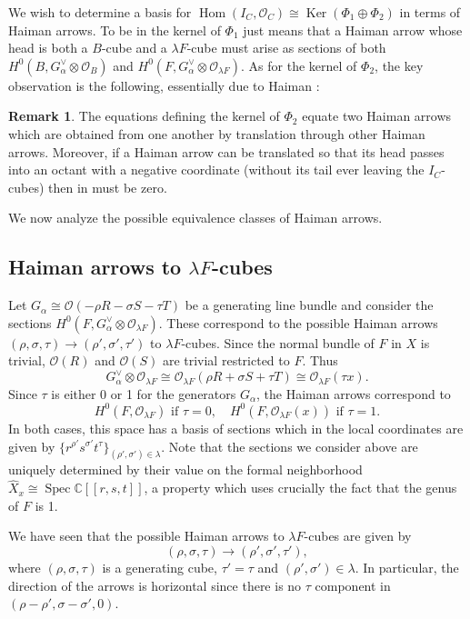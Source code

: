 \documentclass[12pt]{amsart}
\theoremstyle{definition}
\newtheorem{remark}[theorem]{Remark}
\newcommand{\CC} {\mathbb{C}}          %
\renewcommand{\O}{\mathcal{O}}
\newcommand{\Hom}{\operatorname{Hom}}
\newcommand{\Ker}{\operatorname{Ker}}
\newcommand{\Spec}{\operatorname{Spec}}
\renewcommand{\hat}{\widehat}
\begin{document}
We wish to determine a basis for $\Hom (I_{C},\O_{C})\cong \Ker
(\Phi_{1}\oplus \Phi_{2})$ in terms of Haiman arrows. To be in the
kernel of $\Phi_{1}$ just means that a Haiman arrow whose head is both
a $B$-cube and a $\lambda F$-cube must arise as sections of both
$H^{0}(B,G_{\alpha}^{\vee}\otimes \O_{B})$ and
$H^{0}(F,G_{\alpha}^{\vee}\otimes \O_{\lambda F})$. As for the kernel
of $\Phi_{2}$, the key observation is the following, essentially due
to Haiman \cite{Haiman1998}:
\begin{remark}\label{rem: ker of phi2 gives equations equating
translatedarrows} The equations defining the kernel of $\Phi_{2}$
equate two Haiman arrows which are obtained from one another by
translation through other Haiman arrows. Moreover, if a Haiman arrow
can be translated so that its head passes into an octant with a
negative coordinate (without its tail ever leaving the $I_{C}$-cubes)
then in must be zero.
\end{remark}

We now analyze the possible equivalence classes of Haiman arrows.

\subsection{Haiman arrows to $\lambda F$-cubes}

Let $G_{\alpha}\cong \O (-\rho R-\sigma S-\tau T)$ be a generating
line bundle and consider the sections
$H^{0}(F,G_{\alpha}^{\vee}\otimes \O_{\lambda F})$. These correspond
to the possible Haiman arrows $(\rho ,\sigma ,\tau )\to (\rho ',\sigma
',\tau ')$ to $\lambda F$-cubes. Since the normal bundle of $F$ in $X$
is trivial, $\O (R)$ and $\O (S)$ are trivial restricted to $F$. Thus
\[
G_{\alpha}^{\vee}\otimes \O_{\lambda F} \cong \O_{\lambda F}(\rho
R+\sigma S+\tau T)\cong \O_{\lambda F}(\tau x).
\]
Since $\tau$ is either 0 or 1 for the generators $G_{\alpha}$, the
Haiman arrows correspond to 
\[
H^{0}(F,\O_{\lambda F})\text{  if  }\tau =0,\quad H^{0}(F,\O_{\lambda
F}(x))\text{  if  }\tau =1.
\]
In both cases, this space has a basis of sections which in the local
coordinates are given by $\{r^{\rho '}s^{\sigma '}t^{\tau } \}_{(\rho
',\sigma ')\in \lambda}$. Note that the sections we consider above are
uniquely determined by their value on the formal neighborhood
$\hat{X}_{x}\cong \Spec \CC [[r,s,t]]$, a property which uses
crucially the fact that the genus of $F$ is 1.

We have seen that the possible Haiman arrows to $\lambda F$-cubes are
given by 
\[
(\rho ,\sigma ,\tau )\to (\rho ',\sigma ',\tau '),
\]
where $(\rho ,\sigma ,\tau )$ is a generating cube, $\tau '=\tau$ and
$(\rho ',\sigma ')\in \lambda$. In particular, the direction of the
arrows is horizontal since there is no $\tau$ component in $(\rho
-\rho ',\sigma -\sigma ',0)$.
\end{document}
